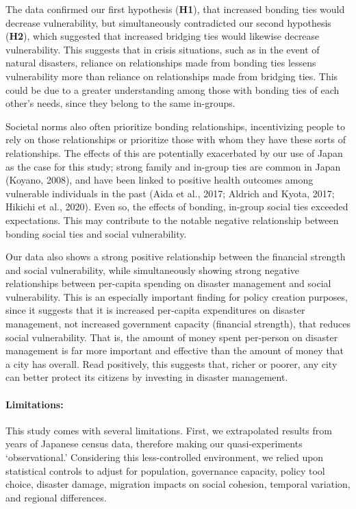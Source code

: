 \documentclass[]{elsarticle} %
\begin{document}
The data confirmed our first hypothesis (\textbf{H1}), that increased
bonding ties would decrease vulnerability, but simultaneously
contradicted our second hypothesis (\textbf{H2}), which suggested that
increased bridging ties would likewise decrease vulnerability. This
suggests that in crisis situations, such as in the event of natural
disasters, reliance on relationships made from bonding ties lessens
vulnerability more than reliance on relationships made from bridging
ties. This could be due to a greater understanding among those with
bonding ties of each other's needs, since they belong to the same
in-groups.

Societal norms also often prioritize bonding relationships,
incentivizing people to rely on those relationships or prioritize those
with whom they have these sorts of relationships. The effects of this
are potentially exacerbated by our use of Japan as the case for this
study; strong family and in-group ties are common in Japan (Koyano,
2008), and have been linked to positive health outcomes among vulnerable
individuals in the past (Aida et al., 2017; Aldrich and Kyota, 2017;
Hikichi et al., 2020). Even so, the effects of bonding, in-group social
ties exceeded expectations. This may contribute to the notable negative
relationship between bonding social ties and social vulnerability.

Our data also shows a strong positive relationship between the financial
strength and social vulnerability, while simultaneously showing strong
negative relationships between per-capita spending on disaster
management and social vulnerability. This is an especially important
finding for policy creation purposes, since it suggests that it is
increased per-capita expenditures on disaster management, not increased
government capacity (financial strength), that reduces social
vulnerability. That is, the amount of money spent per-person on disaster
management is far more important and effective than the amount of money
that a city has overall. Read positively, this suggests that, richer or
poorer, any city can better protect its citizens by investing in
disaster management.

\hypertarget{limitations}{%
\paragraph{Limitations:}\label{limitations}}

This study comes with several limitations. First, we extrapolated
results from years of Japanese census data, therefore making our
quasi-experiments `observational.' Considering this less-controlled
environment, we relied upon statistical controls to adjust for
population, governance capacity, policy tool choice, disaster damage,
migration impacts on social cohesion, temporal variation, and regional
differences.
\end{document}
